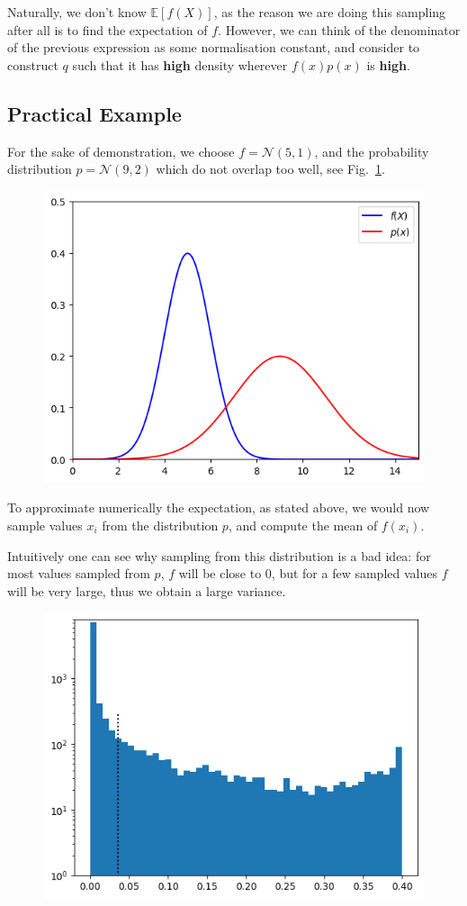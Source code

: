\documentclass[12pt,a4paper]{article}
\begin{document}
Naturally, we don’t know $\mathbb{E}[f(X)]$, as the reason we are doing this sampling after all is to find the expectation of $f$.
However, we can think of the denominator of the previous expression as some normalisation constant, and consider to construct $q$ such that it has \textbf{high} density wherever $f(x)p(x)$ is \textbf{high}.

\subsection{Practical Example}
For the sake of demonstration, we choose $f=\mathcal{N}(5, 1)$, and the probability distribution $p=\mathcal{N}(9,2)$ which do not overlap too well, see Fig.~\ref{fig:f_and_p}.
\begin{figure}[htbp]
\begin{center}
\includegraphics[width=0.5\linewidth]{addons/f_and_p}
\end{center}
\label{fig:f_and_p}
\end{figure}

To approximate numerically the expectation, as stated above, we would now sample values $x_i$ from the distribution $p$, and compute the mean of $f(x_i)$.

Intuitively one can see why sampling from this distribution is a bad idea: for most values sampled from $p$, $f$ will be close to 0, but for a few sampled values $f$ will be very large, thus we obtain a large variance.

\begin{figure}[htbp]
\begin{center}
\includegraphics[width=0.5\linewidth]{addons/bad_sampling}
\end{center}
\label{fig:bad_sampling}
\end{figure}
\end{document}
